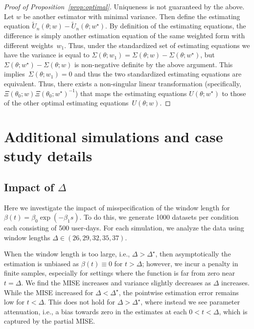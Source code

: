 \documentclass[12pt]{amsart}
\begin{document}
\begin{proof}[Proof of Proposition~\ref{prop:optimal}]
Uniqueness is not guaranteed by the above.  Let $w$ be another estimator with minimal variance.  Then define the estimating equation $\tilde U_n (
\theta; w) - \tilde U_n (\theta; w^\star)$.  By definition of the estimating equations, the difference is simply another estimation equation of the same weighted form with different weights~$w_1$. Thus, under the standardized set of estimating equations we have the variance is equal to
$\Sigma (\theta; w_1) = \Sigma (\theta; w) - \Sigma(\theta; w^\star)$,
but $\Sigma (\theta; w^\star) - \Sigma(\theta; w)$ is non-negative definite by the above argument.  This implies~$\Sigma(\theta;w_1) = 0$ and thus the two standardized estimating equations are equivalent.  Thus, there exists a non-singular linear transformation (specifically, $\Xi (\theta_0; w) \Xi (\theta_0; w^\star)^{-1}$) that maps the estimating equations $U(\theta;w^\star)$ to those of the other optimal estimating equations~$U(\theta; w)$.

\end{proof}

\section{Additional simulations and case study details}
\label{app:extrasims}

\subsection{Impact of $\Delta$}
\label{app:delta}

Here we investigate the impact of misspecification of the window length for $\beta(t) = \beta_0 \exp \left( - \beta_1 s \right)$.  To do this, we generate 1000 datasets per condition each consisting of 500 user-days.  For each simulation, we analyze the data using window lengths $\Delta \in (26,29,32,35,37)$.

When the window length is too large, i.e., $\Delta > \Delta^\star$, then asymptotically the estimation is unbiased as $\beta(t) \equiv 0$ for $t > \Delta$; however, we incur a penalty in finite samples, especially for settings where the function is far from zero near $t = \Delta$.  We find the MISE increases and variance slightly decreases as $\Delta$ increases.  While the MISE increased for $\Delta < \Delta^\star$, the pointwise estimation error remains low for $t < \Delta$.  This does not hold for $\Delta > \Delta^\star$, where instead we see parameter attenuation, i.e., a bias towards zero in the estimates at each $0 < t< \Delta$, which is captured by the partial MISE.
\end{document}
